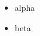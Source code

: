 \documentclass{beamer}
\begin{document}
\begin{frame}
\begin{itemize}\item alpha \item beta\end{itemize}
\end{frame}
\end{document}
